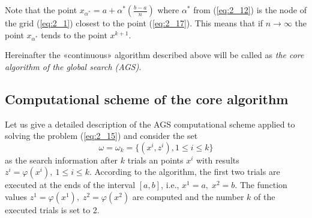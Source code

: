 Note that the point $x_{\alpha^*}=a+\alpha^*(\frac{b-a}{n})$  where $\alpha^*$  from (\ref{eq:2_12}) is the node of the grid (\ref{eq:2_1}) closest to the point (\ref{eq:2_17}). This means that if $n\rightarrow\infty$ the point $x_{\alpha^*}$  tends to the point $x^{k+1}$.

Hereinafter the «continuous» algorithm described above will be called as \textit{the core algorithm of the global search (AGS)}.

\subsection {Computational scheme of the core algorithm}
\label {subsec:2_2_1}
Let us give a detailed description of the AGS computational scheme applied to solving the problem (\ref{eq:2_15}) and consider the set 
\begin{equation}
\label{eq:2_18}
\omega=\omega_k=\{(x^i,z^i),1\leq i\leq k\}
\end{equation}
as the search information after $k$ trials an points $x^i$ with results $z^i=\varphi(x^i),\:1\leq i\leq k$. According to the algorithm, the first two trials are executed at the ends of the interval  $[a,b]$, i.e., $x^1=a,\;x^2=b$. The function values $z^1=\varphi(x^1),\;z^2=\varphi(x^2)$  are computed and the number $k$ of the executed trials is set to 2.

